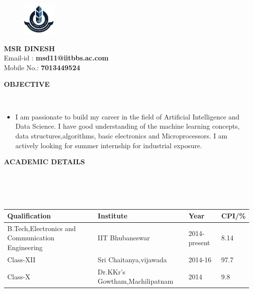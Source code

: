 \documentclass[a4paper,10pt]{article}
\newcommand{\lsep}{-0.5cm}
\newcommand{\resheading}[1]{{\small \colorbox{mygrey}{\begin{minipage}{0.975\textwidth}{\textbf{#1 \vphantom{p\^{E}}}}\end{minipage}}}}
\begin{document}
\linespread{1.25}
\hspace{0.5cm}\\[-0.25cm]
\begin{figure}
\begin{flushleft}
\includegraphics[width=0.15\textwidth, left]{logo}
\end{flushleft}
\end{figure}


\begin{flushright}
\bigbreak
\bigbreak
\bigbreak
\bigbreak
\bigbreak
\textbf{MSR DINESH} \\
\noindent Email-id : \textbf{msd11@iitbbs.ac.com} \\
\noindent Mobile No.: \textbf{7013449524} \\
\end{flushright}
\bigbreak
\bigbreak
\bigbreak
\bigbreak
\bigbreak
\resheading{\textbf{OBJECTIVE} }\\[\lsep]
\begin{itemize}
\item \noindent I am passionate to  build my career in the field of Artificial Intelligence and Data Science. I have   good understanding of the machine learning concepts, data structures,algorithms,  basic electronics and  Microprocessors. I am actively looking for summer internship for industrial exposure.

\end{itemize}


\resheading{\textbf{ACADEMIC DETAILS} }\\[\lsep]
\\ \\
\indent \begin{tabular}{ l @{\hskip 0.1in} l @{\hskip 0.1in} l @{\hskip 0.1in} l}
\hline
\textbf{Qualification} &  \textbf{Institute} & \textbf{Year} & \textbf{CPI/\%} \\
\hline
B.Tech,Electronics and Communication Engineering & IIT Bhubaneswar & 2014-present & 8.14 \\
Class-XII & Sri Chaitanya,vijawada & 2014-16 & 97.7\\
Class-X & Dr.KKr's Gowtham,Machilipatnam & 2014 & 9.8 \\

\hline
\end{tabular}
\\ \\
\end{document}
